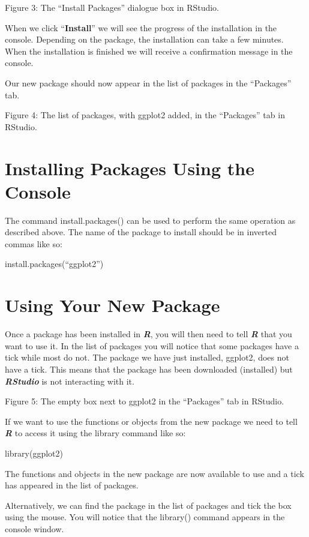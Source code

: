 \documentclass[
]{book}
\begin{document}
Figure 3: The ``Install Packages'' dialogue box in RStudio.

When we click ``\textbf{Install}'' we will see the progress of the installation in the console. Depending on the package, the installation can take a few minutes. When the installation is finished we will receive a confirmation message in the console.

Our new package should now appear in the list of packages in the ``Packages'' tab.

Figure 4: The list of packages, with ggplot2 added, in the ``Packages'' tab in RStudio.

\section{Installing Packages Using the Console}\label{installing-packages-using-the-console}

The command install.packages() can be used to perform the same operation as described above. The name of the package to install should be in inverted commas like so:

install.packages(``ggplot2'')

\section{Using Your New Package}\label{using-your-new-package}

Once a package has been installed in \textbf{\emph{R}}, you will then need to tell \textbf{\emph{R}} that you want to use it. In the list of packages you will notice that some packages have a tick while most do not. The package we have just installed, ggplot2, does not have a tick. This means that the package has been downloaded (installed) but \textbf{\emph{RStudio}} is not interacting with it.

Figure 5: The empty box next to ggplot2 in the ``Packages'' tab in RStudio.

If we want to use the functions or objects from the new package we need to tell \textbf{\emph{R}} to access it using the library command like so:

library(ggplot2)

The functions and objects in the new package are now available to use and a tick has appeared in the list of packages.

Alternatively, we can find the package in the list of packages and tick the box using the mouse. You will notice that the library() command appears in the console window.
\end{document}
